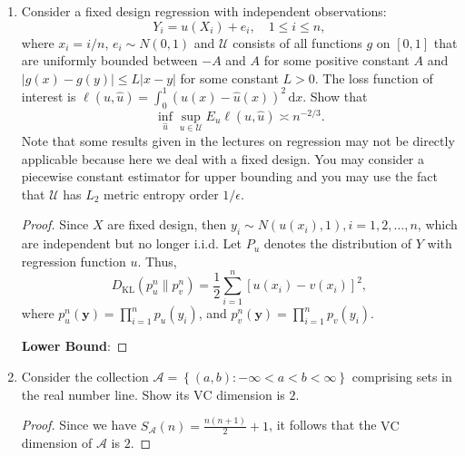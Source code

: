 \begin{enumerate}
	\item Consider a fixed design regression with independent observations:
	      \begin{equation*}
		      Y_{i}=u\left(X_{i}\right)+e_{i},\quad 1\leq i\leq n,
	      \end{equation*}
	      where $x_{i}=i/n$, $e_{i}\sim N(0,1)$ and $\mathcal{U}$ consists of all functions $g$ on $[0,1]$ that are uniformly bounded between $-A$ and $A$ for some positive constant $A$ and $|g(x)-g(y)|\leq L|x-y|$ for some constant $L>0$. The loss function of interest is $\ell(u,\hat{u})=\int_{0}^{1}(u(x)-\hat{u}(x))^{2}\,\mathrm{d}x$. Show that
	      \begin{equation*}
		      \inf_{\hat{u}}\sup_{u\in\mathcal{U}}E_{u}\ell(u,\hat{u})\asymp n^{-2/3}.
	      \end{equation*}
	      Note that some results given in the lectures on regression may not be directly applicable because here we deal with a fixed design. You may consider a piecewise constant estimator for upper bounding and you may use the fact that $\mathcal{U}$ has $L_{2}$ metric entropy order $1/\epsilon$.
	      \begin{proof}
		      Since $X$ are fixed design, then $y_{i}\sim N(u(x_{i}),1), i=1,2,\ldots,n$, which are independent but no longer i.i.d.  Let $P_{u}$ denotes the distribution of $Y$ with regression function $u$. Thus,
		      \begin{equation*}
			      D_{\text{KL}}\left(p_{u}^{n}\|p_{v}^{n}\right)=\frac{1}{2}\sum_{i=1}^{n}\left[u(x_{i})-v(x_{i})\right]^{2},
		      \end{equation*}
		      where $p_{u}^{n}(\mathbf{y})=\prod_{i=1}^{n}p_{u}(y_{i})$, and $p_{v}^{n}(\mathbf{y})=\prod_{i=1}^{n}p_{v}(y_{i})$.

		      \textbf{Lower Bound}:
	      \end{proof}
	\item Consider the collection $\mathcal{A}=\left\{(a,b):-\infty<a<b<\infty\right\}$ comprising sets in the real number line. Show its $\mathrm{VC}$ dimension is $2$.
	      \begin{proof}
		      Since we have $S_{\mathcal{A}}(n)=\frac{n(n+1)}{2}+1$, it follows that the $\mathrm{VC}$ dimension of $\mathcal{A}$ is $2$.
	      \end{proof}
\end{enumerate}
